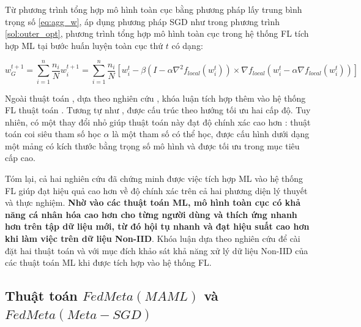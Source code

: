 Từ phương trình tổng hợp mô hình toàn cục bằng phương pháp lấy trung bình trọng số \ref{eq:agg_w}, áp dụng phương pháp SGD như trong phương trình \ref{sol:outer_opt}, phương trình tổng hợp mô hình toàn cục trong hệ thống FL tích hợp ML tại bước huấn luyện toàn cục thứ $t$ có dạng:

\begin{dmath}
    \label{eq:agg_fedmeta}
    w_G^{t+1} = \sum_{i=1}^n{\frac{n_i}{N} w_i^{t+1}}
        = \sum_{i=1}^n{\frac{n_i}{N}\left[ w_i^t - \beta \left( I - \alpha \nabla^2 f_{local}(w_i^t) \right) \times \nabla f_{local}\left( w_i^t - \alpha\nabla f_{local}(w_i^t)\right) \right]}
\end{dmath}

Ngoài thuật toán , dựa theo nghiên cứu \cite{chen2018federated}, khóa luận tích hợp thêm vào hệ thống FL thuật toán . Tương tự như ,  được cấu trúc theo hướng tối ưu hai cấp độ. Tuy nhiên, có một thay đổi nhỏ giúp thuật toán này đạt độ chính xác cao hơn : thuật toán coi siêu tham số học $\alpha$ là một tham số có thể học, được cấu hình dưới dạng một mảng có kích thước bằng trọng số mô hình và được tối ưu trong mục tiêu cấp cao.

Tóm lại, cả hai nghiên cứu \parencite{chen2018federated, fallah2020personalized} đã chứng minh được việc tích hợp ML vào hệ thống FL giúp đạt hiệu quả cao hơn  về độ chính xác trên cả hai phương diện lý thuyết và thực nghiệm. \textbf{Nhờ vào các thuật toán ML, mô hình toàn cục có khả năng cá nhân hóa cao hơn cho từng người dùng và thích ứng nhanh hơn trên tập dữ liệu mới, từ đó hội tụ nhanh và đạt hiệu suất cao hơn khi làm việc trên dữ liệu Non-IID}. Khóa luận dựa theo nghiên cứu \cite{chen2018federated} để cài đặt hai thuật toán  và  với mục đích khảo sát khả năng xử lý dữ liệu Non-IID của các thuật toán ML khi được tích hợp vào hệ thống FL.

\subsection{Thuật toán $FedMeta(MAML)$ và $FedMeta(Meta-SGD)$}

